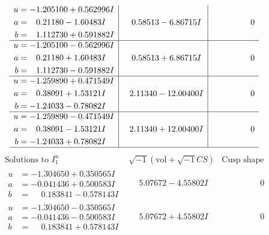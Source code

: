 \documentclass[1p]{elsarticle_modified}
\theoremstyle{definition}
\newcommand{\I}{\sqrt{-1}}
\begin{document}
$$\begin{array}{c|c|c}
\begin{aligned}
u &= -1.205100 + 0.562996 I \\
a &= \phantom{-}0.21180 - 1.60483 I \\
b &= \phantom{-}1.112730 + 0.591882 I\end{aligned}
 & \phantom{-}0.58513 - 6.86715 I & \phantom{-0.000000 } 0 \\ \hline\begin{aligned}
u &= -1.205100 - 0.562996 I \\
a &= \phantom{-}0.21180 + 1.60483 I \\
b &= \phantom{-}1.112730 - 0.591882 I\end{aligned}
 & \phantom{-}0.58513 + 6.86715 I & \phantom{-0.000000 } 0 \\ \hline\begin{aligned}
u &= -1.259890 + 0.471549 I \\
a &= \phantom{-}0.38091 + 1.53121 I \\
b &= -1.24033 - 0.78082 I\end{aligned}
 & \phantom{-}2.11340 - 12.00400 I & \phantom{-0.000000 } 0 \\ \hline\begin{aligned}
u &= -1.259890 - 0.471549 I \\
a &= \phantom{-}0.38091 - 1.53121 I \\
b &= -1.24033 + 0.78082 I\end{aligned}
 & \phantom{-}2.11340 + 12.00400 I & \phantom{-0.000000 } 0\\
 \hline 
 \end{array}$$\newpage$$\begin{array}{c|c|c}  
\text{Solutions to }I^u_{1}& \I (\text{vol} + \sqrt{-1}CS) & \text{Cusp shape}\\
 \hline 
\begin{aligned}
u &= -1.304650 + 0.350565 I \\
a &= -0.041436 + 0.500583 I \\
b &= \phantom{-}0.183841 - 0.578143 I\end{aligned}
 & \phantom{-}5.07672 - 4.55802 I & \phantom{-0.000000 } 0 \\ \hline\begin{aligned}
u &= -1.304650 - 0.350565 I \\
a &= -0.041436 - 0.500583 I \\
b &= \phantom{-}0.183841 + 0.578143 I\end{aligned}
 & \phantom{-}5.07672 + 4.55802 I & \phantom{-0.000000 } 0 \\ \hline\begin{aligned}

\end{aligned}
\end{array}$$
\end{document}
